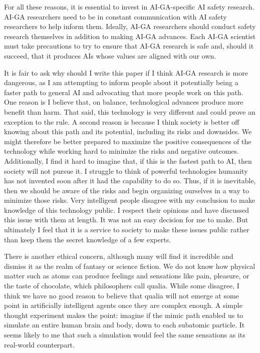 \documentclass{article}
\begin{document}
For all these reasons, it is essential to invest in AI-GA-specific AI safety research. AI-GA researchers need to be in constant communication with AI safety researchers to help inform them. Ideally, AI-GA researchers should conduct safety research themselves in addition to making AI-GA advances.  Each AI-GA scientist must take precautions to try to ensure that AI-GA research is safe and, should it succeed, that it produces AIs whose values are aligned with our own.  

It is fair to ask why should I write this paper if I think AI-GA research is more dangerous, as I am attempting to inform people about it potentially being a faster path to general AI and advocating that more people work on this path. One reason is I believe that, on balance, technological advances produce more benefit than harm. That said, this technology is very different and could prove an exception to the rule. A second reason is because I think society is better off knowing about this path and its potential, including its risks and downsides. We might therefore be better prepared to maximize the positive consequences of the technology while working hard to minimize the risks and negative outcomes. Additionally, I find it hard to imagine that, if this is the fastest path to AI, then society will not pursue it. I struggle to think of powerful technologies humanity has not invented soon after it had the capability to do so. Thus, if it is inevitable, then we should be aware of the risks and begin organizing ourselves in a way to minimize those risks. 
Very intelligent people disagree with my conclusion to make knowledge of this technology public. I respect their opinions and have discussed this issue with them at length. It was not an easy decision for me to make. But ultimately I feel that it is a service to society to make these issues public rather than keep them the secret knowledge of a few experts. 

There is another ethical concern, although many will find it incredible and dismiss it as the realm of fantasy or science fiction. We do not know how physical matter such as atoms can produce feelings and sensations like pain, pleasure, or the taste of chocolate, which philosophers call qualia. While some disagree, I think we have no good reason to believe that qualia will not emerge at some point in artificially intelligent agents once they are complex enough. A simple thought experiment makes the point: imagine if the mimic path enabled us to simulate an entire human brain and body, down to each subatomic particle. It seems likely to me that such a simulation would feel the same sensations as its real-world counterpart. 
\end{document}
